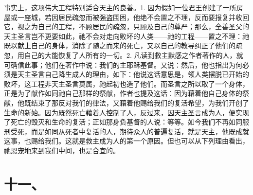 事实上，这项伟大工程特别适合天主的良善。1. 因为假如一位君王创建了一所房屋或一座城，若因居民疏忽而被强盗围困，他绝不会置之不理，反而要报复并收回它，视之为自己的工程，不顾居民的疏忽，只顾及自己的尊严；那么，全善圣父的天主圣言岂不更要如此，祂不会对走向败坏的人类——祂的工程——置之不理：祂既以献上自己的身体，消除了随之而来的死亡，又以自己的教导纠正了他们的疏忽，用自己的大能恢复了人所有的一切。2. 凡读到救主默感之作者著作的人，就可确信此事；他们在著作中说：我们的主耶稣基督。又说：然后，他也指出为何必须是天主圣言自己降生成人的理由，如下：他说这话意思是，领人类摆脱已开始的败坏，这工程非天主圣言莫属，祂起初也造了他们。而圣言之所以取了一个身体，正是为了献作如同祂自己那样的祭献，作者也提及这话：因为藉着他自己身体的祭献，他既结束了那反对我们的律法，又藉着他赐给我们的复活希望，为我们开创了生命的新始。因为既然死亡藉着人控制了人，反过来，因天主圣言成为人，便实现了死亡的毁灭和生命的复活；正如那身负基督的人说：等等。如今我们不再如同服刑受死，而是如同从死者中复活的人，期待众人的普遍复活，就是天主，他既成就这事，也赐给我们。这就是救主成为人的第一个原因。但也可以从下列理由看出，祂恩宠地来到我们中间，也是合宜的。\par


\section{十一、}

